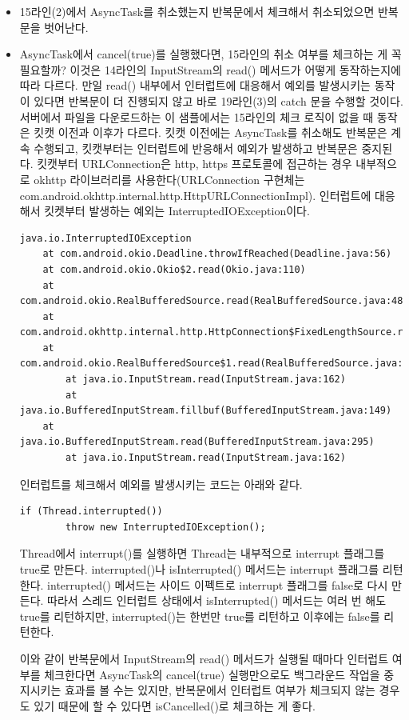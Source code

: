 \begin{itemize}
\item 15라인(2)에서 AsyncTask를 취소했는지 반복문에서 체크해서 취소되었으면 반복문을 벗어난다.

\item AsyncTask에서 cancel(true)를 실행했다면, 15라인의 취소 여부를 체크하는 게 꼭 필요할까?
이것은 14라인의 InputStream의 read() 메서드가 어떻게 동작하는지에 따라 다르다.
만일 read() 내부에서 인터럽트에 대응해서 예외를 발생시키는 동작이 있다면 반복문이 더 진행되지 않고  바로 19라인(3)의 catch 문을 수행할 것이다.
서버에서 파일을 다운로드하는 이 샘플에서는 15라인의 체크 로직이 없을 때 동작은 킷캣 이전과 이후가 다르다.
킷캣 이전에는 AsyncTask를 취소해도 반복문은 계속 수행되고, 킷캣부터는 인터럽트에 반응해서 예외가 발생하고 반복문은 중지된다.
킷캣부터 URLConnection은 http, https 프로토콜에 접근하는 경우 내부적으로 okhttp 라이브러리를 사용한다(URLConnection 구현체는 com.android.okhttp.internal.http.HttpURLConnectionImpl).
인터럽트에 대응해서 킷켓부터 발생하는 예외는 InterruptedIOException이다.
\begin{lstlisting}[frame=single]
 java.io.InterruptedIOException
	at com.android.okio.Deadline.throwIfReached(Deadline.java:56)
	at com.android.okio.Okio$2.read(Okio.java:110)
	at com.android.okio.RealBufferedSource.read(RealBufferedSource.java:48)
	at com.android.okhttp.internal.http.HttpConnection$FixedLengthSource.read(HttpConnection.java:446)
	at com.android.okio.RealBufferedSource$1.read(RealBufferedSource.java:168)
    	at java.io.InputStream.read(InputStream.java:162)
    	at java.io.BufferedInputStream.fillbuf(BufferedInputStream.java:149)
	at java.io.BufferedInputStream.read(BufferedInputStream.java:295)
    	at java.io.InputStream.read(InputStream.java:162)
\end{lstlisting}

인터럽트를 체크해서 예외를 발생시키는 코드는 아래와 같다.
\begin{lstlisting}[frame=single]
	if (Thread.interrupted()) 
		throw new InterruptedIOException();
\end{lstlisting}

\colorbox{tearose}{\parbox[t]{15cm}{
Thread에서 interrupt()를 실행하면  Thread는 내부적으로 interrupt 플래그를 true로 만든다.
interrupted()나 isInterrupted() 메서드는 interrupt 플래그를 리턴한다. interrupted() 메서드는 사이드 이펙트로 interrupt 플래그를 false로 다시 만든다.
따라서 스레드 인터럽트 상태에서 isInterrupted() 메서드는 여러 번 해도 true를 리턴하지만, interrupted()는 한번만 true를 리턴하고 이후에는 false를 리턴한다.
}}\newline\newline

이와 같이 반복문에서 InputStream의 read() 메서드가 실행될 때마다 인터럽트 여부를 체크한다면 AsyncTask의  cancel(true) 실행만으로도 백그라운드 작업을 중지시키는 효과를 볼 수는 있지만,
반복문에서 인터럽트 여부가 체크되지 않는 경우도 있기 때문에  할 수 있다면 isCancelled()로 체크하는 게 좋다.
\end{itemize}

